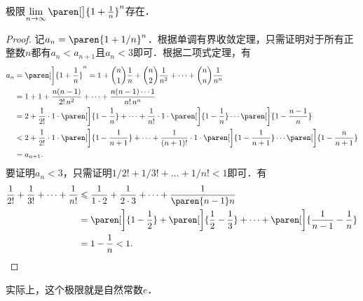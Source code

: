 \begin{theorem}
  \label{thm:seqe}
  极限\(\lim\limits_{n\to\infty} \paren[\big]{1 + \frac1n}^n\)存在．

  \begin{proof}
    记\(a_n = \paren{1+1/n}^n\)．根据单调有界收敛定理，只需证明对于所有正整数\(n\)都有\(a_n < a_{n+1}\)且\(a_n < 3\)即可．根据二项式定理，有
    \begin{align*}
      a_n
      &= \paren[\bigg]{1+\frac1n}^n
        = 1 + \binom{n}{1} \frac1n  + \binom{n}{2} \frac1{n^2} + \dots + \binom{n}{n} \frac1{n^n} \\
      &= 1 + 1 + \frac{n(n-1)}{2!\,n^2} + \dots + \frac{n(n-1)\dotsm1}{n!\,n^n} \\
      &= 2 + \frac1{2!} \cdot 1 \cdot \paren[\bigg]{1 - \frac1n} + \dots
        + \frac1{n!} \cdot 1 \cdot \paren[\bigg]{1 - \frac1n} \dotsm \paren[\bigg]{1 - \frac{n-1}n} \\
      &< 2 + \frac1{2!} \cdot 1 \cdot \paren[\bigg]{1 - \frac1{n+1}} + \dots
        + \frac1{(n+1)!} \cdot 1 \cdot \paren[\bigg]{1 - \frac1{n+1}} \dotsm \paren[\bigg]{1 - \frac{n}{n+1}} \\
      &= a_{n+1}.
    \end{align*}
    要证明\(a_n < 3\)，只需证明\(1/2! + 1/3! + \dots + 1/n! < 1\)即可．有
    \begin{align*}
      \frac1{2!} + \frac1{3!} + \dots + \frac1{n!}
      &\le \frac{1}{1 \cdot 2} + \frac{1}{2 \cdot 3} + \dots + \frac{1}{\paren{n-1}n} \\
      &= \paren[\bigg]{1 - \frac12} + \paren[\bigg]{\frac12 - \frac13} + \dots + \paren[\bigg]{\frac1{n-1} - \frac1n} \\
      &= 1 - \frac1n < 1. \qedhere
    \end{align*}
  \end{proof}

  \begin{remark}
    实际上，这个极限就是自然常数\(e\)．
  \end{remark}
\end{theorem}

